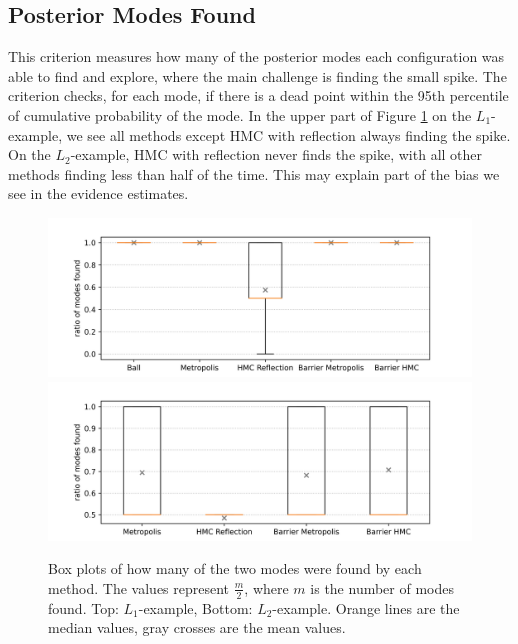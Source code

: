 \documentclass[12pt, a4paper]{report}
\begin{document}
\subsection{Posterior Modes Found}
This criterion measures how many of the posterior modes each configuration was able to find and explore, where the main challenge is finding the small spike.
The criterion checks, for each mode, if there is a dead point within the 95th percentile of cumulative probability of the mode.
In the upper part of Figure \ref{fig:results_modes_found} on the $L_1$-example, we see all methods except HMC with reflection always finding the spike.
On the $L_2$-example, HMC with reflection never finds the spike, with all other methods finding less than half of the time.
This may explain part of the bias we see in the evidence estimates.
\begin{figure}
    \centering
    \includegraphics[scale=0.4]{figs/results/modes_found_spike_20d.png}
    \includegraphics[scale=0.4]{figs/results/modes_found_spike_offcenter_20d.png}
    \caption{Box plots of how many of the two modes were found by each method. The values represent $\frac{m}{2}$, where $m$ is the number of modes found. Top: $L_1$-example, Bottom: $L_2$-example. Orange lines are the median values, gray crosses are the mean values.}
    \label{fig:results_modes_found}
\end{figure}
\end{document}
